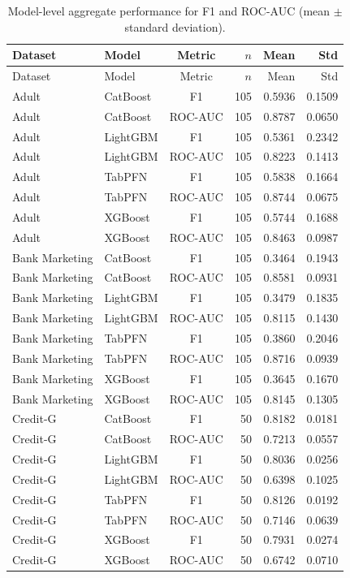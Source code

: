 \begin{longtable}{llcNNN}
\caption{Model-level aggregate performance for F1 and ROC-AUC (mean $\pm$ standard deviation).}\label{tab:model-summary}\\
\toprule
Dataset & Model & Metric & $n$ & Mean & Std \\
\midrule
\endfirsthead
\toprule
Dataset & Model & Metric & $n$ & Mean & Std \\
\midrule
\endhead
Adult & CatBoost & F1 & 105 & 0.5936 & 0.1509 \\
Adult & CatBoost & ROC-AUC & 105 & 0.8787 & 0.0650 \\
Adult & LightGBM & F1 & 105 & 0.5361 & 0.2342 \\
Adult & LightGBM & ROC-AUC & 105 & 0.8223 & 0.1413 \\
Adult & TabPFN & F1 & 105 & 0.5838 & 0.1664 \\
Adult & TabPFN & ROC-AUC & 105 & 0.8744 & 0.0675 \\
Adult & XGBoost & F1 & 105 & 0.5744 & 0.1688 \\
Adult & XGBoost & ROC-AUC & 105 & 0.8463 & 0.0987 \\
Bank Marketing & CatBoost & F1 & 105 & 0.3464 & 0.1943 \\
Bank Marketing & CatBoost & ROC-AUC & 105 & 0.8581 & 0.0931 \\
Bank Marketing & LightGBM & F1 & 105 & 0.3479 & 0.1835 \\
Bank Marketing & LightGBM & ROC-AUC & 105 & 0.8115 & 0.1430 \\
Bank Marketing & TabPFN & F1 & 105 & 0.3860 & 0.2046 \\
Bank Marketing & TabPFN & ROC-AUC & 105 & 0.8716 & 0.0939 \\
Bank Marketing & XGBoost & F1 & 105 & 0.3645 & 0.1670 \\
Bank Marketing & XGBoost & ROC-AUC & 105 & 0.8145 & 0.1305 \\
Credit-G & CatBoost & F1 & 50 & 0.8182 & 0.0181 \\
Credit-G & CatBoost & ROC-AUC & 50 & 0.7213 & 0.0557 \\
Credit-G & LightGBM & F1 & 50 & 0.8036 & 0.0256 \\
Credit-G & LightGBM & ROC-AUC & 50 & 0.6398 & 0.1025 \\
Credit-G & TabPFN & F1 & 50 & 0.8126 & 0.0192 \\
Credit-G & TabPFN & ROC-AUC & 50 & 0.7146 & 0.0639 \\
Credit-G & XGBoost & F1 & 50 & 0.7931 & 0.0274 \\
Credit-G & XGBoost & ROC-AUC & 50 & 0.6742 & 0.0710 \\
\bottomrule
\end{longtable}
